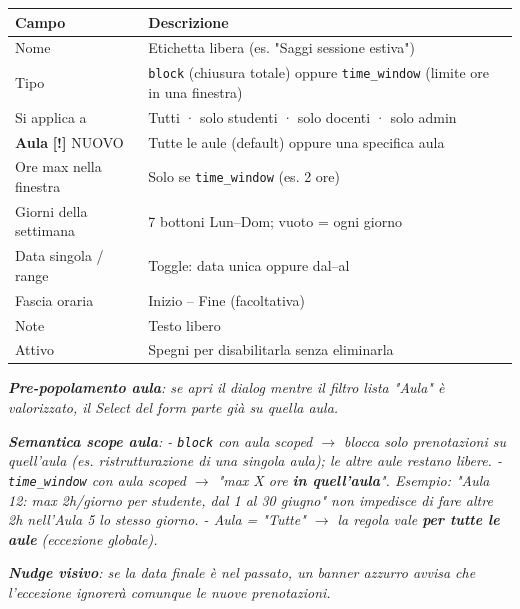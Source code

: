 \documentclass[11pt,a4paper]{article}
\renewenvironment{quote}
  {\begin{list}{}{%
      \setlength{\leftmargin}{8pt}%
      \setlength{\rightmargin}{8pt}%
      \setlength{\topsep}{6pt}%
      \setlength{\parsep}{0pt}}%
      \item\relax\color{black!75}\itshape}
  {\end{list}}
\begin{document}
\begin{table}[H]
\centering
\small
\begin{tabularx}{\linewidth}{|X|X|}
\hline
\rowcolor{tableheader} Campo & Descrizione \\
\hline
Nome & Etichetta libera (es. "Saggi sessione estiva") \\
\hline
Tipo & \texttt{block} (chiusura totale) oppure \texttt{time\_window} (limite ore in una finestra) \\
\hline
Si applica a & Tutti · solo studenti · solo docenti · solo admin \\
\hline
\textbf{Aula} \textbf{[!]} NUOVO & Tutte le aule (default) oppure una specifica aula \\
\hline
Ore max nella finestra & Solo se \texttt{time\_window} (es. 2 ore) \\
\hline
Giorni della settimana & 7 bottoni Lun--Dom; vuoto = ogni giorno \\
\hline
Data singola / range & Toggle: data unica oppure dal--al \\
\hline
Fascia oraria & Inizio -- Fine (facoltativa) \\
\hline
Note & Testo libero \\
\hline
Attivo & Spegni per disabilitarla senza eliminarla \\
\hline
\end{tabularx}
\end{table}


\begin{quote}
\textbf{Pre-popolamento aula}: se apri il dialog mentre il filtro lista "Aula" è valorizzato, il Select del form parte già su quella aula.
\end{quote}

\begin{quote}
\textbf{Semantica scope aula}:  - \texttt{block} con aula scoped $\rightarrow$ blocca solo prenotazioni su quell'aula (es. ristrutturazione di una singola aula); le altre aule restano libere. - \texttt{time\_window} con aula scoped $\rightarrow$ "max X ore \textbf{in quell'aula}". Esempio: "Aula 12: max 2h/giorno per studente, dal 1 al 30 giugno" non impedisce di fare altre 2h nell'Aula 5 lo stesso giorno. - Aula = "Tutte" $\rightarrow$ la regola vale \textbf{per tutte le aule} (eccezione globale).
\end{quote}

\begin{quote}
\textbf{Nudge visivo}: se la data finale è nel passato, un banner azzurro avvisa che l'eccezione ignorerà comunque le nuove prenotazioni.
\end{quote}
\end{document}
